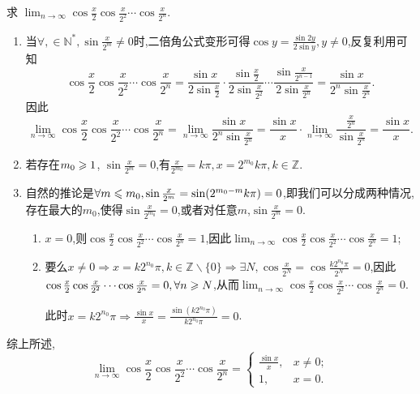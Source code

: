 \begin{exercise}[1.3.6]
    求 $\lim_{n \to \infty} \cos\frac{x}{2} \cos\frac{x}{2^2} \cdots \cos\frac{x}{2^n}$.
\end{exercise}

\begin{solution}
    \begin{enumerate}[(1)]
        \item 当$\forall , \in \mathbb{N}^*,\sin \frac{x}{2^m} \ne 0$时,二倍角公式变形可得$\cos y = \frac{\sin 2y}{2 \sin y},y\neq 0$,反复利用可知$$\cos\frac{x}{2} \cos\frac{x}{2^2} \cdots \cos\frac{x}{2^n} = \frac{\sin x}{2 \sin \frac{x}{2}} \cdot \frac{\sin \frac{x}{2}}{2 \sin \frac{x}{2^2}} \cdots \frac{\sin \frac{x}{2^{n-1}}}{2 \sin \frac{x}{2^n}} = \frac{\sin x}{2^n \sin \frac{x}{2^n}}.$$
              因此$$\lim_{n \to \infty} \cos\frac{x}{2} \cos\frac{x}{2^2} \cdots \cos\frac{x}{2^n} = \lim_{n \to \infty} \frac{\sin x}{2^n \sin \frac{x}{2^n}} = \frac{\sin x}{x} \cdot \lim_{n \to \infty} \frac{\frac{x}{2^n}}{\sin\frac{x}{2^n}} = \frac{\sin x}{x}.$$
        \item 若存在$m_0 \geqslant 1$, $\sin \frac{x}{2^{m}} = 0$,有$\frac{x}{2^{m_0}}= k\pi,x = 2^{m_0}k \pi, k \in \mathbb{Z}$.
        \item 
        自然的推论是$\forall m\leqslant m_0, \sin \frac{x}{2^m}=\sin (2^{m_0-m}k \pi)  =0$,即我们可以分成两种情况,存在最大的$m_0$,使得$\sin \frac{x}{2^{m_0}} = 0$,或者对任意$m$,$\sin \frac{x}{2^m} = 0$.
              \begin{enumerate}
                  \item $x = 0$,则$\cos\frac{x}{2} \cos\frac{x}{2^2} \cdots \cos\frac{x}{2^n} = 1$,因此$\lim_{n \to \infty} \cos\frac{x}{2} \cos\frac{x}{2^2} \cdots \cos\frac{x}{2^n} = 1$;
                  \item 要么$x \ne 0 \Rightarrow x = k 2^{n_0} \pi, k \in \mathbb{Z} \backslash \{0\} \Rightarrow \exists N, \cos \frac{x}{2^N} = \cos \frac{k 2^{n_0} \pi}{2^N} = 0$,因此$\cos\frac{x}{2} \cos\frac{x}{2^2} \cdots \cos\frac{x}{2^n} = 0, \forall n \geqslant N$,从而$\lim_{n \to \infty} \cos\frac{x}{2} \cos\frac{x}{2^2} \cdots \cos\frac{x}{2^n} = 0$.

                        此时$x = k 2^{n_0} \pi \Rightarrow \frac{\sin x}{x} = \frac{\sin (k 2^{n_0} \pi)}{k 2^{n_0} \pi} = 0$.
              \end{enumerate}
    \end{enumerate}
    综上所述,$$\lim_{n \to \infty} \cos\frac{x}{2} \cos\frac{x}{2^2} \cdots \cos\frac{x}{2^n} = \begin{cases}
            \frac{\sin x}{x}, & x \ne 0; \\
            1,                & x = 0.
        \end{cases}
    $$

\end{solution}


